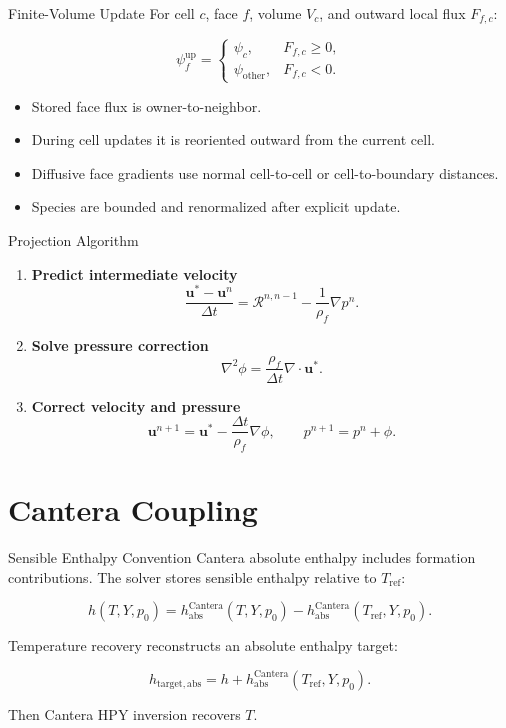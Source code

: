 \documentclass[aspectratio=169,11pt]{beamer}
\begin{document}
\begin{frame}{Finite-Volume Update}
  For cell \(c\), face \(f\), volume \(V_c\), and outward local flux \(F_{f,c}\):

  \[
    \psi_f^{\mathrm{up}} =
    \begin{cases}
      \psi_c, & F_{f,c} \ge 0, \\
      \psi_{\mathrm{other}}, & F_{f,c} < 0.
    \end{cases}
  \]

  \begin{itemize}
    \item Stored face flux is owner-to-neighbor.
    \item During cell updates it is reoriented outward from the current cell.
    \item Diffusive face gradients use normal cell-to-cell or cell-to-boundary
          distances.
    \item Species are bounded and renormalized after explicit update.
  \end{itemize}
\end{frame}

\begin{frame}{Projection Algorithm}
  \begin{enumerate}
    \item \textbf{Predict intermediate velocity}
          \[
            \frac{\mathbf{u}^{*}-\mathbf{u}^n}{\Delta t}
            =
            \mathcal{R}^{n,n-1}
            -
            \frac{1}{\rho_f}\nabla p^n.
          \]

    \item \textbf{Solve pressure correction}
          \[
            \nabla^2 \phi =
            \frac{\rho_f}{\Delta t}\nabla\cdot\mathbf{u}^{*}.
          \]

    \item \textbf{Correct velocity and pressure}
          \[
            \mathbf{u}^{n+1}
            =
            \mathbf{u}^{*}
            -
            \frac{\Delta t}{\rho_f}\nabla\phi,
            \qquad
            p^{n+1}=p^n+\phi.
          \]
  \end{enumerate}
\end{frame}

\section{Cantera Coupling}

\begin{frame}{Sensible Enthalpy Convention}
  Cantera absolute enthalpy includes formation contributions.  The solver stores
  sensible enthalpy relative to \(T_{\mathrm{ref}}\):

  \[
    h(T,Y,p_0)
    =
    h_{\mathrm{abs}}^{\mathrm{Cantera}}(T,Y,p_0)
    -
    h_{\mathrm{abs}}^{\mathrm{Cantera}}(T_{\mathrm{ref}},Y,p_0).
  \]

  Temperature recovery reconstructs an absolute enthalpy target:

  \[
    h_{\mathrm{target,abs}}
    =
    h
    +
    h_{\mathrm{abs}}^{\mathrm{Cantera}}(T_{\mathrm{ref}},Y,p_0).
  \]

  Then Cantera HPY inversion recovers \(T\).
\end{frame}
\end{document}
